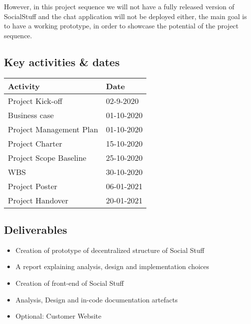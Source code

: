 However, in this project sequence we will not have a fully released version of SocialStuff and the chat application
will not be deployed either, the main goal is to have a working prototype, in order to showcase the potential of the
project sequence.

\subsection{Key activities \& dates}\label{subsec:key-activities-and-dates}

\begin{table}[htp]
    \centering
    \begin{tabular}{@{}|l|l|@{}}
        \hline
        \textbf{Activity}       & \textbf{Date} \\
        \toprule
        \hline
        Project Kick-off        & 02-9-2020     \\
        Business case           & 01-10-2020    \\
        Project Management Plan & 01-10-2020    \\
        Project Charter         & 15-10-2020    \\
        Project Scope Baseline  & 25-10-2020    \\
        WBS                     & 30-10-2020    \\
        Project Poster          & 06-01-2021    \\
        Project Handover        & 20-01-2021    \\
        \hline
    \end{tabular}\label{tab:table2}
\end{table}

\subsection{Deliverables}\label{subsec:deliverables}

\begin{itemize}
    \item Creation of prototype of decentralized structure of Social Stuff
    \item A report explaining analysis, design and implementation choices
    \item Creation of front-end of Social Stuff
    \item Analysis, Design and in-code documentation artefacts
    \item Optional: Customer Website
\end{itemize}


